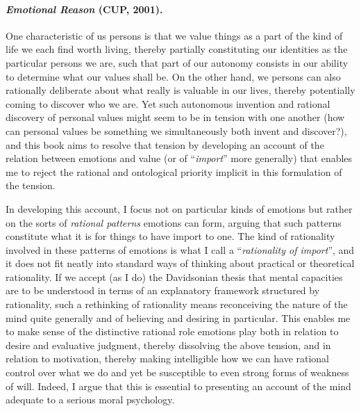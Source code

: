 \documentclass[11pt]{article}
\begin{document}
\paragraph{\emph{Emotional Reason} (CUP, 2001).}

One characteristic of us persons is that we value things as a part of the kind of life we each find worth living, thereby partially constituting our identities as the particular persons we are, such that part of our autonomy consists in our ability to determine what our values shall be. On the other hand, we persons can also rationally deliberate about what really is valuable in our lives, thereby potentially coming to discover who we are. Yet such autonomous invention and rational discovery of personal values might seem to be in tension with one another (how can personal values be something we simultaneously both invent and discover?), and this book aims to resolve that tension by developing an account of the relation between emotions and value (or of \enquote{\emph{import}} more generally) that enables me to reject the rational and ontological priority implicit in this formulation of the tension.

In developing this account, I focus not on particular kinds of emotions but rather on the sorts of \emph{rational patterns} emotions can form, arguing that such patterns constitute what it is for things to have import to one. The kind of rationality involved in these patterns of emotions is what I call a \enquote{\emph{rationality of import}}, and it does not fit neatly into standard ways of thinking about practical or theoretical rationality. If we accept (as I do) the Davidsonian thesis that mental capacities are to be understood in terms of an explanatory framework structured by rationality, such a rethinking of rationality means reconceiving the nature of the mind quite generally and of believing and desiring in particular. This enables me to make sense of the distinctive rational role emotions play both in relation to desire and evaluative judgment, thereby dissolving the above tension, and in relation to motivation, thereby making intelligible how we can have rational control over what we do and yet be susceptible to even strong forms of weakness of will. Indeed, I argue that this is essential to presenting an account of the mind adequate to a serious moral psychology.

\end{document}
